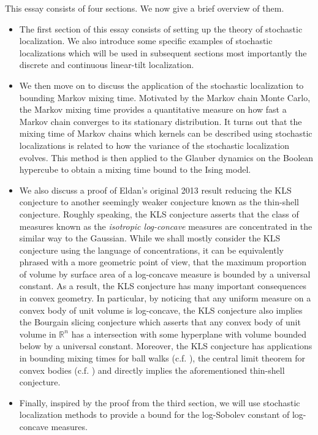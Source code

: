 This essay consists of four sections. We now give a brief overview of them.

\begin{itemize}
  \item The first section of this essay consists of setting up the theory of stochastic localization.
    We also introduce some specific examples of stochastic localizations which will be used in subsequent 
    sections most importantly the discrete and continuous linear-tilt localization. 
  \item We then move on to discuss the application of the stochastic localization to bounding Markov 
    mixing time. Motivated by the Markov chain Monte Carlo, the Markov mixing time provides a quantitative 
    measure on how fast a Markov chain converges to its stationary distribution. It turns out that 
    the mixing time of Markov chains which kernels can be described using stochastic localizations 
    is related to how the variance of the stochastic localization evolves. This method is then applied  
    to the Glauber dynamics on the Boolean hypercube to obtain a mixing time bound to the Ising model. 
  \item We also discuss a proof of Eldan's original 2013 result reducing the KLS conjecture to another seemingly 
    weaker conjecture known as the thin-shell conjecture. Roughly speaking, the KLS conjecture asserts 
    that the class of measures known as the \textit{isotropic log-concave} measures are concentrated in the similar 
    way to the Gaussian. While we shall mostly consider the KLS conjecture using the language 
    of concentrations, it can be equivalently phrased with a more geometric point of view, that the 
    maximum proportion of volume by surface area of a log-concave measure is bounded by a universal constant. 
    As a result, the KLS conjecture has many important consequences in convex geometry. 
    In particular, by noticing that any uniform measure on a convex body of unit volume is log-concave, 
    the KLS conjecture also implies the Bourgain slicing conjecture which asserts that any convex body 
    of unit volume in \(\mathbb{R}^n\) has a intersection with some hyperplane with volume bounded below 
    by a universal constant. Moreover, the KLS conjecture has applications in bounding mixing times for 
    ball walks (c.f. \cite{Lee_2016}), the central limit theorem for convex bodies (c.f. \cite{Giannopoulos}) 
    and directly implies the aforementioned thin-shell conjecture.
  \item Finally, inspired by the proof from the third section, we will use stochastic localization methods to 
    provide a bound for the log-Sobolev constant of log-concave measures.
\end{itemize}

